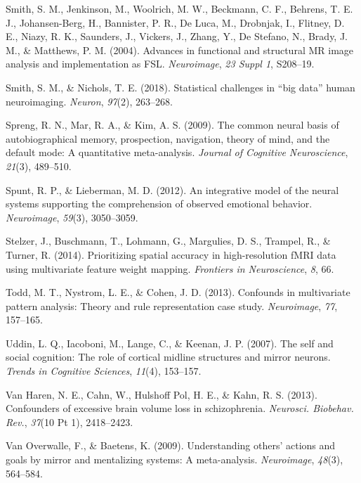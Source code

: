 \documentclass[12pt,american,a4paper,oneside,]{memoir} %
\begin{document}
\leavevmode\hypertarget{ref-Smith2004-sc}{}%
Smith, S. M., Jenkinson, M., Woolrich, M. W., Beckmann, C. F., Behrens, T. E. J., Johansen-Berg, H., Bannister, P. R., De Luca, M., Drobnjak, I., Flitney, D. E., Niazy, R. K., Saunders, J., Vickers, J., Zhang, Y., De Stefano, N., Brady, J. M., \& Matthews, P. M. (2004). Advances in functional and structural MR image analysis and implementation as FSL. \emph{Neuroimage}, \emph{23 Suppl 1}, S208--19.

\leavevmode\hypertarget{ref-Smith2018-th}{}%
Smith, S. M., \& Nichols, T. E. (2018). Statistical challenges in ``big data'' human neuroimaging. \emph{Neuron}, \emph{97}(2), 263--268.

\leavevmode\hypertarget{ref-spreng2009common}{}%
Spreng, R. N., Mar, R. A., \& Kim, A. S. (2009). The common neural basis of autobiographical memory, prospection, navigation, theory of mind, and the default mode: A quantitative meta-analysis. \emph{Journal of Cognitive Neuroscience}, \emph{21}(3), 489--510.

\leavevmode\hypertarget{ref-spunt2012integrative}{}%
Spunt, R. P., \& Lieberman, M. D. (2012). An integrative model of the neural systems supporting the comprehension of observed emotional behavior. \emph{Neuroimage}, \emph{59}(3), 3050--3059.

\leavevmode\hypertarget{ref-stelzer2014prioritizing}{}%
Stelzer, J., Buschmann, T., Lohmann, G., Margulies, D. S., Trampel, R., \& Turner, R. (2014). Prioritizing spatial accuracy in high-resolution fMRI data using multivariate feature weight mapping. \emph{Frontiers in Neuroscience}, \emph{8}, 66.

\leavevmode\hypertarget{ref-Todd2013-sd}{}%
Todd, M. T., Nystrom, L. E., \& Cohen, J. D. (2013). Confounds in multivariate pattern analysis: Theory and rule representation case study. \emph{Neuroimage}, \emph{77}, 157--165.

\leavevmode\hypertarget{ref-uddin2007self}{}%
Uddin, L. Q., Iacoboni, M., Lange, C., \& Keenan, J. P. (2007). The self and social cognition: The role of cortical midline structures and mirror neurons. \emph{Trends in Cognitive Sciences}, \emph{11}(4), 153--157.

\leavevmode\hypertarget{ref-Van_Haren2013-iv}{}%
Van Haren, N. E., Cahn, W., Hulshoff Pol, H. E., \& Kahn, R. S. (2013). Confounders of excessive brain volume loss in schizophrenia. \emph{Neurosci. Biobehav. Rev.}, \emph{37}(10 Pt 1), 2418--2423.

\leavevmode\hypertarget{ref-van2009understanding}{}%
Van Overwalle, F., \& Baetens, K. (2009). Understanding others' actions and goals by mirror and mentalizing systems: A meta-analysis. \emph{Neuroimage}, \emph{48}(3), 564--584.
\end{document}
